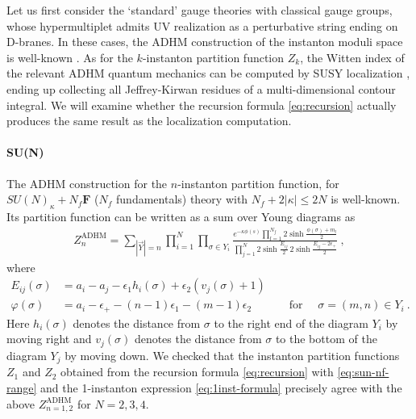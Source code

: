 \documentclass[letterpaper, 11pt]{article}
\def\e{\epsilon}
\def\s{\sigma}
\begin{document}
{Let us first consider the `standard' gauge theories with classical gauge groups, whose hypermultiplet admits UV realization as a perturbative string ending on D-branes. In these cases, the ADHM construction of the instanton moduli space is well-known \cite{Atiyah:1978ri,Nekrasov:2002qd,Shadchin:2005mx}. 
As for the $k$-instanton partition function $Z_k$, the Witten index of the relevant ADHM quantum mechanics can be computed by SUSY localization \cite{Kim:2011mv, Hwang:2014uwa,Hwang:2016gfw, Lee:2017lfw}, ending up collecting all Jeffrey-Kirwan residues of a multi-dimensional contour integral. We will examine whether the recursion formula \eqref{eq:recursion} actually produces  the same result as the localization computation.

\paragraph{SU(N)}

The ADHM construction for the $n$-instanton partition function, for $SU(N)_\kappa +N_f \mathbf{F}$ ($N_f$ fundamentals) theory with $N_f + 2|\kappa| \leq 2N$ is well-known. Its partition function can be written as a sum over Young diagrams as
\begin{align}
  \label{eq:SUn-young}
  Z_n^\text{ADHM} = \sum_{|\vec{Y}| = n}\prod_{i=1}^N\prod_{\s \in Y_i}\frac{e^{-\kappa \phi(s)} \prod_{l=1}^{N_f} 2\sinh{\frac{\phi(\s)+m_l}{2}}  }{\prod_{j=1}^N 2\sinh{\frac{E_{ij}}{2}}\,2\sinh{\frac{E_{ij}-2\e_+}{2}}} \ , 
\end{align}
where
\begin{align*}
  E_{ij}(\s) &= a_i - a_j - \e_1 h_i(\s)+ \e_2(v_j(\s)+1)\\
  \varphi(\s)&= a_i  -\e_+-(n-1)\e_1-(m-1)\e_2
   \quad \qquad\text{ for }\quad \s = (m,n) \in Y_i \ . 
\end{align*}
Here $h_i(\s)$ denotes the distance from $\s$ to the right end of the diagram $Y_i$ by moving right and $v_j(\s)$ denotes the distance from $\s$ to the bottom of the diagram $Y_j$ by moving down.
We checked that the instanton partition functions $Z_1$ and $Z_2$ obtained from the recursion formula \eqref{eq:recursion} with \eqref{eq:sun-nf-range} and the 1-instanton expression \eqref{eq:1inst-formula} precisely agree with the above  $Z_{n=1,2}^\text{ADHM}$ for $N=2,3,4$. 

}
\end{document}
